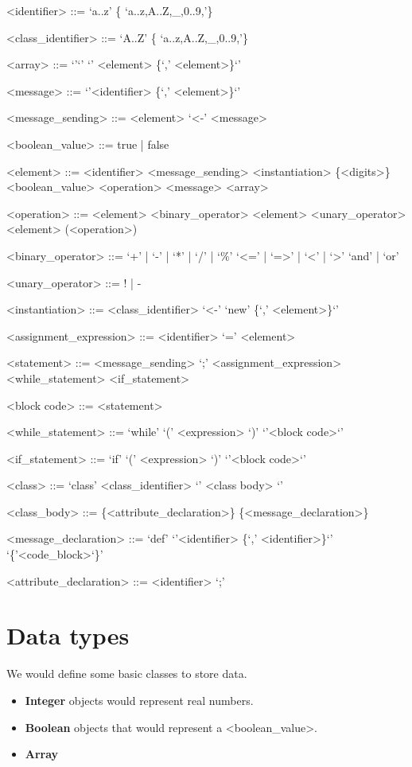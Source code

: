 \documentclass{eplDoc}
\begin{document}
\maketitle
\newpage

\begin{grammar}
<identifier> ::= `a..z' \{ `a..z,A..Z,\_,0..9,'\} 

<class\_identifier> ::= `A..Z' \{ `a..z,A..Z,\_,0..9,'\} 

<array> ::= `{'`}' \alt `{' <element> \{`,' <element>\}`}'

<message> ::= `{'<identifier> \{`,' <element>\}`}'

<message\_sending> ::= <element> `<-' <message>

<boolean\_value> ::= true | false

<element> ::= <identifier> 
\alt<message\_sending>
\alt<instantiation>
\alt \{<digits>\}
\alt <boolean\_value>
\alt <operation>
\alt <message>
\alt <array>

<operation> ::= <element> <binary\_operator> <element>
\alt <unary\_operator> <element>
\alt (<operation>)

<binary\_operator> ::= `+' | `-' | `*' | `/' | `\%' 
\alt `<=' | `=>' | `<' | `>'
\alt `and' | `or'

<unary\_operator> ::= ! | - 

<instantiation> ::= <class\_identifier> `<-' `{new' \{`,' <element>\}`}'


<assignment\_expression> ::= <identifier> `=' <element>

<statement> ::= <message\_sending> `;'
\alt <assignment\_expression>
\alt <while\_statement>
\alt <if\_statement>

<block code> ::= { <statement> }

<while\_statement> ::= `while' `(' <expression> `)'  `{'<block code>`}'

<if\_statement> ::= `if' `(' <expression> `)'  `{'<block code>`}'




<class> ::= `class' <class\_identifier> `{' <class body> `}'

<class\_body> ::= \{<attribute\_declaration>\} \{<message\_declaration>\}

<message\_declaration> ::= `def'  `{'<identifier> \{`,' <identifier>\}`}' `\{'<code\_block>`\}'

<attribute\_declaration> ::= <identifier> `;'









\end{grammar}


\section{Data types}

We would define some basic classes to store data. 

\begin{itemize}
	\item \textbf{Integer} objects would represent real numbers. 
	\item \textbf{Boolean} objects that would represent a <boolean\_value>.
	\item \textbf{Array} 
\end{itemize}
\end{document}
